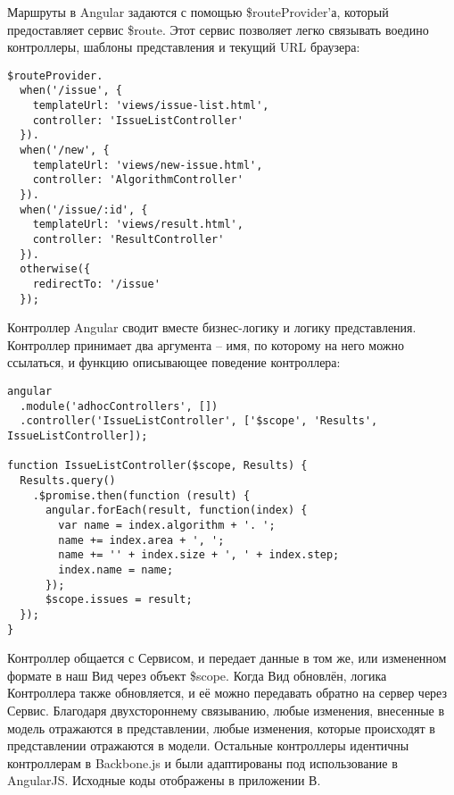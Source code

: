 Маршруты в Angular задаются с помощью \$routeProvider'а, который предоставляет сервис \$route. Этот сервис позволяет легко связывать воедино контроллеры, шаблоны представления и текущий URL браузера:
\begin{lstlisting}[basicstyle=\scriptsize]
$routeProvider.
  when('/issue', {
    templateUrl: 'views/issue-list.html',
    controller: 'IssueListController'
  }).
  when('/new', {
    templateUrl: 'views/new-issue.html',
    controller: 'AlgorithmController'
  }).
  when('/issue/:id', {
    templateUrl: 'views/result.html',
    controller: 'ResultController'
  }).
  otherwise({
    redirectTo: '/issue'
  });
\end{lstlisting}

Контроллер Angular сводит вместе бизнес-логику и логику представления. Контроллер принимает два аргумента – имя, по которому на него можно ссылаться, и функцию описывающее поведение контроллера:
\begin{lstlisting}[basicstyle=\scriptsize]
angular
  .module('adhocControllers', [])
  .controller('IssueListController', ['$scope', 'Results', IssueListController]);

function IssueListController($scope, Results) {
  Results.query()
    .$promise.then(function (result) {
      angular.forEach(result, function(index) {
        var name = index.algorithm + '. ';
        name += index.area + ', ';
        name += '' + index.size + ', ' + index.step;
        index.name = name;
      });
      $scope.issues = result;
  });
}
\end{lstlisting}

Контроллер общается с Сервисом, и передает данные в том же, или измененном формате в наш Вид через объект \$scope. Когда Вид обновлён, логика Контроллера также обновляется, и её можно передавать обратно на сервер через Сервис. Благодаря двухстороннему связыванию, любые изменения, внесенные в модель отражаются в представлении, любые изменения, которые происходят в представлении отражаются в модели. Остальные контроллеры идентичны контроллерам в Backbone.js и были адаптированы под использование в AngularJS. Исходные коды отображены в приложении В.


